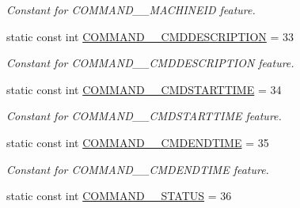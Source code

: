 \begin{DoxyCompactItemize}
\begin{DoxyCompactList}\small\item\em Constant for COMMAND\_\-\_\-MACHINEID feature. \item\end{DoxyCompactList}\item 
\hypertarget{classUMS__Data_1_1UMS__DataPackage_a5b4fbd2785244819ad56fb38ee5312df}{
static const int \hyperlink{classUMS__Data_1_1UMS__DataPackage_a5b4fbd2785244819ad56fb38ee5312df}{COMMAND\_\-\_\-CMDDESCRIPTION} = 33}
\label{classUMS__Data_1_1UMS__DataPackage_a5b4fbd2785244819ad56fb38ee5312df}

\begin{DoxyCompactList}\small\item\em Constant for COMMAND\_\-\_\-CMDDESCRIPTION feature. \item\end{DoxyCompactList}\item 
\hypertarget{classUMS__Data_1_1UMS__DataPackage_a2a80c81a86dad3990b07d3247b9668c5}{
static const int \hyperlink{classUMS__Data_1_1UMS__DataPackage_a2a80c81a86dad3990b07d3247b9668c5}{COMMAND\_\-\_\-CMDSTARTTIME} = 34}
\label{classUMS__Data_1_1UMS__DataPackage_a2a80c81a86dad3990b07d3247b9668c5}

\begin{DoxyCompactList}\small\item\em Constant for COMMAND\_\-\_\-CMDSTARTTIME feature. \item\end{DoxyCompactList}\item 
\hypertarget{classUMS__Data_1_1UMS__DataPackage_a31f2a8f4e34929716392edad8a0b7d3b}{
static const int \hyperlink{classUMS__Data_1_1UMS__DataPackage_a31f2a8f4e34929716392edad8a0b7d3b}{COMMAND\_\-\_\-CMDENDTIME} = 35}
\label{classUMS__Data_1_1UMS__DataPackage_a31f2a8f4e34929716392edad8a0b7d3b}

\begin{DoxyCompactList}\small\item\em Constant for COMMAND\_\-\_\-CMDENDTIME feature. \item\end{DoxyCompactList}\item 
\hypertarget{classUMS__Data_1_1UMS__DataPackage_a9f9ec885820e94fecbeac89516d25da8}{
static const int \hyperlink{classUMS__Data_1_1UMS__DataPackage_a9f9ec885820e94fecbeac89516d25da8}{COMMAND\_\-\_\-STATUS} = 36}
\label{classUMS__Data_1_1UMS__DataPackage_a9f9ec885820e94fecbeac89516d25da8}


\end{DoxyCompactItemize}
